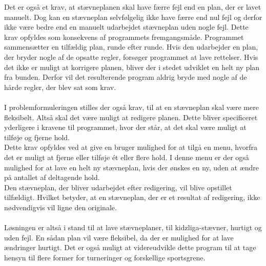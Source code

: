 




Det er også et krav, at stævneplanen skal have færre fejl end en plan, der er lavet manuelt. Dog kan en stævneplan selvfølgelig ikke have færre end nul fejl og derfor ikke være bedre end en manuelt udarbejdet stævneplan uden nogle fejl. 
Dette krav opfyldes som konsekvens af programmets fremgangsmåde. Programmet sammensætter en tilfældig plan, runde efter runde. Hvis den udarbejder en plan, der bryder nogle af de opsatte regler, forsøger programmet at lave rettelser. Hvis det ikke er muligt at korrigere planen, bliver der i stedet udviklet en helt ny plan fra bunden. Derfor vil det resulterende program aldrig bryde med nogle af de hårde regler, der blev sat som krav. 
\\\\
I problemformuleringen stilles der også krav, til at en stævneplan skal være mere fleksibelt. Altså skal det være muligt at redigere planen. Dette bliver specificeret yderligere i kravene til programmet, hvor der står, at det skal være muligt at tilføje og fjerne hold.\\
Dette krav opfyldes ved at give en bruger mulighed for at tilgå en menu, hvorfra det er muligt at fjerne eller tilføje ét eller flere hold. I denne menu er der også mulighed for at lave en helt ny stævneplan, hvis der ønskes en ny, uden at ændre på antallet af deltagende hold.
\\
Den stævneplan, der bliver udarbejdet efter redigering, vil blive opstillet tilfældigt. Hvilket betyder, at en stævneplan, der er et resultat af redigering, ikke nødvendigvis vil ligne den originale.
\\\\
Løsningen er altså i stand til at lave stævneplaner, til kidzliga-stævner, hurtigt og uden fejl. En sådan plan vil være fleksibel, da der er mulighed for at lave ændringer hurtigt. Det er også muligt at videreudvikle dette program til at tage hensyn til flere former for turneringer og forskellige sportsgrene.


